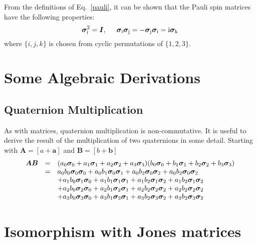 \documentclass[12pt]{article}
\newcommand{\Ci}{{\rm i}}
\newcommand\pauli[1]{\ensuremath{ \bm{\sigma}_{\rm #1} }}
\begin{document}
From the definitions of Eq.~\ref{pauli}, it can be shown that the Pauli spin
matrices have the following properties:
\begin{equation}
\pauli{i}^2 = \bm{I}, \hspace{5mm} 
\pauli{i}\pauli{j} = -\pauli{j}\pauli{i} = \Ci\pauli{k}
\end{equation}
where $\{i,j,k\}$ is chosen from cyclic permutations of $\{1,2,3\}$.


\section{Some Algebraic Derivations}

\subsection{Quaternion Multiplication}
As with matrices, quaternion multiplication is non-commutative.  It is
useful to derive the result of the multiplication of two quaternions in some
detail. Starting with $\bm{A}=[a+\bm{a}]$ and $\bm{B}=[b+\bm{b}]$
\begin{eqnarray}\label{multiplication}
\begin{array}{ccl}
\bm{A}\bm{B} & = &
(a_0\pauli{0} + a_1\pauli{1} + a_2\pauli{2} + a_3\pauli{3})
(b_0\pauli{0} + b_1\pauli{1} + b_2\pauli{2} + b_3\pauli{3}) \\
& = & a_0b_0\pauli{0}\pauli{0} + a_0b_1\pauli{0}\pauli{1}
	+ a_0b_2\pauli{0}\pauli{2} + a_0b_2\pauli{0}\pauli{2} \\
& & + a_1b_0\pauli{1}\pauli{0} + a_1b_1\pauli{1}\pauli{1}
	+ a_1b_2\pauli{1}\pauli{2} + a_1b_2\pauli{1}\pauli{2} \\
& & + a_2b_0\pauli{2}\pauli{0} + a_2b_1\pauli{2}\pauli{1}
	+ a_2b_2\pauli{2}\pauli{2} + a_2b_2\pauli{2}\pauli{2} \\
& & + a_3b_0\pauli{3}\pauli{0} + a_3b_1\pauli{3}\pauli{1}
	+ a_3b_2\pauli{3}\pauli{2} + a_3b_2\pauli{3}\pauli{2}
\end{array}
\end{eqnarray}


\section{Isomorphism with Jones matrices}
\end{document}
